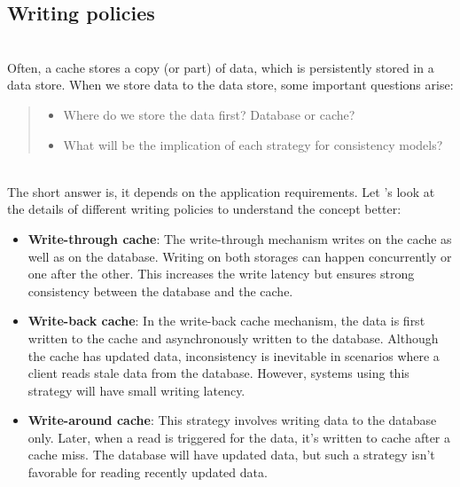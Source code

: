 \subsection{Writing policies}\label{pMnok9_dwrtG22EeBP7p4}
\\
Often, a cache stores a copy (or part) of data, which is persistently stored in a data store. When we store data to the data store, some important questions arise:
\begin{quote}
\begin{itemize}
\item
Where do we store the data first? Database or cache?
\item
What will be the implication of each strategy for consistency models?
\end{itemize}
\end{quote}
\\
The short answer is, it depends on the application requirements. Let 's look at the details of different writing policies to understand the concept better:

\begin{itemize}
\item
\protect{}\label{8rM2bjYtG6LiYIe1Cq9uE}
\textbf{Write-through cache}: The write-through mechanism writes on the cache as well as on the database. Writing on both storages can happen concurrently or one after the other. This increases the write latency but ensures strong consistency between the database and the cache.
\item
\protect{}\label{IQnxTkJX6KtFJoMOfu6Cp}
\textbf{Write-back cache}: In the write-back cache mechanism, the data is first written to the cache and asynchronously written to the database. Although the cache has updated data, inconsistency is inevitable in scenarios where a client reads stale data from the database. However, systems using this strategy will have small writing latency.
\item
\protect{}\label{u9LRu9pbPTsxswvgN1NFU}
\textbf{Write-around cache}: This strategy involves writing data to the database only. Later, when a read is triggered for the data, it's written to cache after a cache miss. The database will have updated data, but such a strategy isn't favorable for reading recently updated data.
\end{itemize}

